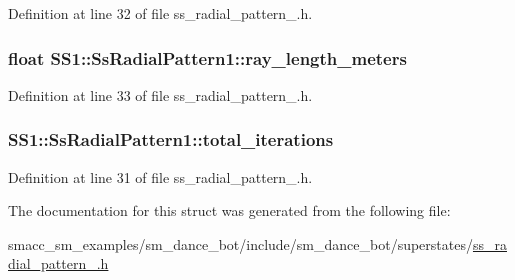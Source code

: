 Definition at line 32 of file ss\+\_\+radial\+\_\+pattern\+\_.\+h.

\subsubsection[{\texorpdfstring{ray\+\_\+length\+\_\+meters}{ray_length_meters}}]{\setlength{\rightskip}{0pt plus 5cm}float S\+S1\+::\+Ss\+Radial\+Pattern1\+::ray\+\_\+length\+\_\+meters}\hypertarget{structSS1_1_1SsRadialPattern1_a376d5c9d155cfe4e80d7fcf04faaea35}{}\label{structSS1_1_1SsRadialPattern1_a376d5c9d155cfe4e80d7fcf04faaea35}


Definition at line 33 of file ss\+\_\+radial\+\_\+pattern\+\_.\+h.

\subsubsection[{\texorpdfstring{total\+\_\+iterations}{total_iterations}}]{ S\+S1\+::\+Ss\+Radial\+Pattern1\+::total\+\_\+iterations}\hypertarget{structSS1_1_1SsRadialPattern1_a9edeb3b4420bc9d560459e522a26eeab}{}\label{structSS1_1_1SsRadialPattern1_a9edeb3b4420bc9d560459e522a26eeab}


Definition at line 31 of file ss\+\_\+radial\+\_\+pattern\+\_.\+h.



The documentation for this struct was generated from the following file\+:\begin{DoxyCompactItemize}
\item 
smacc\+\_\+sm\+\_\+examples/sm\+\_\+dance\+\_\+bot/include/sm\+\_\+dance\+\_\+bot/superstates/\hyperlink{ss__radial__pattern__1_8h}{ss\+\_\+radial\+\_\+pattern\+\_.\+h}\end{DoxyCompactItemize}
